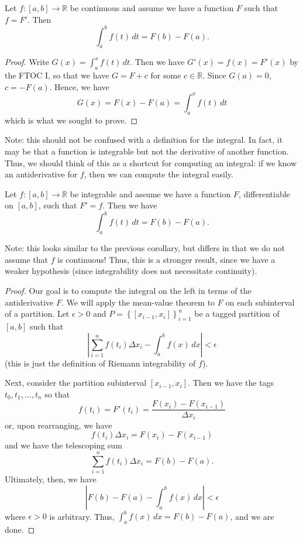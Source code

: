 \begin{corollary}
Let $f:\left[a,b\right]\rightarrow \mathbb{R}$ be continuous and assume we have a function $F$ such that $f=F'$. Then $$ \int_a^b f\left(t\right)\, dt = F\left(b\right) - F\left(a\right). $$
\end{corollary}
\begin{proof}
Write $G\left(x\right) = \int_a^x f\left(t\right)\, dt $. Then we have $G'\left(x\right) = f\left(x\right) = F'\left(x\right)$ by the FTOC I, so that we have $G = F + c$ for some $c \in \mathbb{R}$. Since $G\left(a\right) = 0$, $c= -F\left(a\right)$. Hence, we have $$G\left(x\right) = F\left(x\right)-F\left(a\right) = \int_a^x f\left(t\right)\, dt $$ which is what we sought to prove.
\end{proof}
Note: this should not be confused with a definition for the integral. In fact, it may be that a function is integrable but not the derivative of another function. Thus, we should think of this as a shortcut for computing an integral: if we know an antiderivative for $f$, then we can compute the integral easily.

\begin{theorem}
Let $f:\left[a,b\right]\rightarrow \mathbb{R}$ be integrable and assume we have a function $F$, differentiable on $\left[a,b\right]$, such that $F'=f$. Then we have $$ \int_a^b f\left(t\right)\, dt = F\left(b\right) - F\left(a\right). $$
\end{theorem}
Note: this looks similar to the previous corollary, but differs in that we do not assume that $f$ is continuous! Thus, this is a stronger result, since we have a weaker hypothesis (since integrability does not necessitate continuity).
\begin{proof}
Our goal is to compute the integral on the left in terms of the antiderivative $F$. We will apply the mean-value theorem to $F$ on each subinterval of a partition. Let $\epsilon >0$ and $P= \left\{ \left[x_{i-1},x_i\right]\right\}_{i=1}^n$ be a tagged partition of $\left[a,b\right]$ such that $$ \left| \sum_{i=1}^n f\left(t_i\right) \Delta x_i - \int_a^b f\left(x\right)\, dx\right| < \epsilon $$ (this is just the definition of Riemann integrability of $f$). 

Next, consider the partition subinterval $\left[x_{i-1},x_i\right]$. Then we have the tags $t_0,t_1,\ldots,t_n$ so that $$ f\left(t_i\right) = F'\left(t_i\right) = \frac{F\left(x_i\right)-F\left(x_{i-1}\right)}{\Delta x_i} $$ or, upon rearranging, we have $$ f\left(t_i\right)\Delta x_i = F\left(x_i\right) - F\left(x_{i-1}\right) $$ and we have the telescoping sum $$ \sum_{i=1}^n f\left(t_i\right)\Delta x_i = F\left(b\right) - F\left(a\right). $$ Ultimately, then, we have $$ \left| F\left(b\right)- F\left(a\right) - \int_a^b f\left(x\right)\, dx\right| < \epsilon $$ where $\epsilon >0 $ is arbitrary. Thus, $\int_a^b f\left(x\right)\, dx = F\left(b\right)-F\left(a\right)$, and we are done.
\end{proof}







{}



